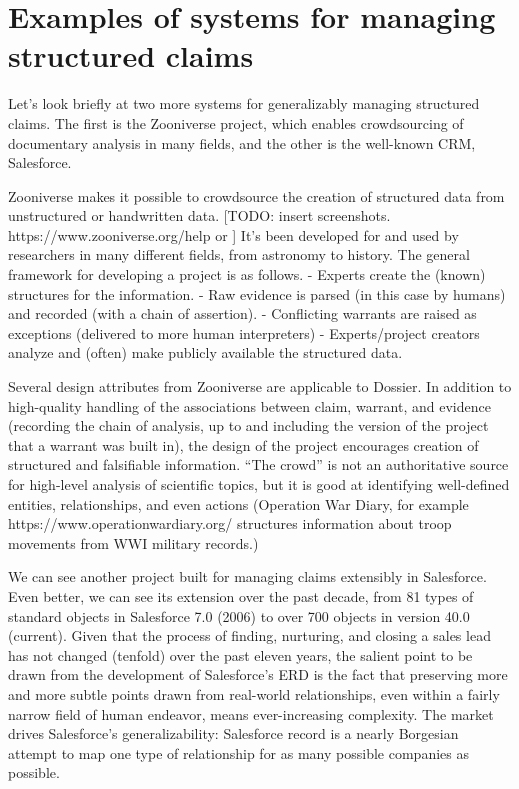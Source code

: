 \documentclass[format=siggraph, review=true]{acmart}
\begin{document}
\section{Examples of systems for managing structured claims}
Let's look briefly at two more systems for generalizably managing structured claims. The first is the Zooniverse project, which enables crowdsourcing of documentary analysis in many fields, and the other is the well-known CRM, Salesforce. 

Zooniverse makes it possible to crowdsource the creation of structured data from unstructured or handwritten data. [TODO: insert screenshots. https://www.zooniverse.org/help  or ] It's been developed for and used by researchers in many different fields, from astronomy to history. The general framework for developing a project is as follows.
- Experts create the (known) structures for the information. 
- Raw evidence is parsed (in this case by humans) and recorded (with a chain of assertion). 
- Conflicting warrants are raised as exceptions (delivered to more human interpreters)
- Experts/project creators analyze and (often) make publicly available the structured data. 

Several design attributes from Zooniverse are applicable to Dossier. In addition to high-quality handling of the associations between claim, warrant, and evidence (recording the chain of analysis, up to and including the version of the project that a warrant was built in), the design of the project encourages creation of structured and falsifiable information. ``The crowd'' is not an authoritative source for high-level analysis of scientific topics, but it is good at identifying well-defined entities, relationships, and even actions (Operation War Diary, for example https://www.operationwardiary.org/ structures information about troop movements from WWI military records.)

We can see another project built for managing claims extensibly in Salesforce. Even better, we can see its extension over the past decade, from 81 types of standard objects in Salesforce 7.0 (2006) to over 700 objects in version 40.0 (current). Given that the process of finding, nurturing, and closing a sales lead has not changed (tenfold) over the past eleven years, the salient point to be drawn from the development of Salesforce's ERD is the fact that preserving more and more subtle points drawn from real-world relationships, even within a fairly narrow field of human endeavor, means ever-increasing complexity. The market drives Salesforce's generalizability: Salesforce record is a nearly Borgesian attempt to map one type of relationship for as many possible companies as possible.
\end{document}
